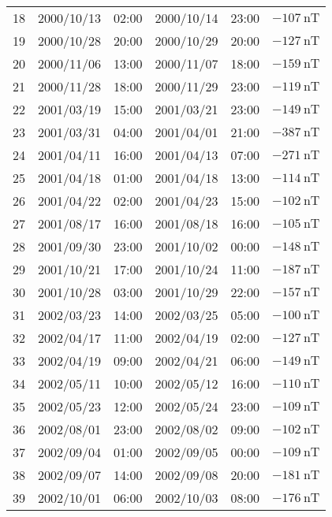 \begin{table}[ht]
\begin{adjustbox}{width=\textwidth,totalheight=0.9\textheight,keepaspectratio}
\begin{tabular}{cccccc}
    18 & 2000/10/13 & 02:00 & 2000/10/14 & 23:00 & $ \SI{-107}{\nano\tesla}$ \\
    19 & 2000/10/28 & 20:00 & 2000/10/29 & 20:00 & $ \SI{-127}{\nano\tesla}$ \\
    20 & 2000/11/06 & 13:00 & 2000/11/07 & 18:00 & $ \SI{-159}{\nano\tesla}$ \\
    21 & 2000/11/28 & 18:00 & 2000/11/29 & 23:00 & $ \SI{-119}{\nano\tesla}$ \\
    22 & 2001/03/19 & 15:00 & 2001/03/21 & 23:00 & $ \SI{-149}{\nano\tesla}$ \\
    23 & 2001/03/31 & 04:00 & 2001/04/01 & 21:00 & $ \SI{-387}{\nano\tesla}$ \\
    24 & 2001/04/11 & 16:00 & 2001/04/13 & 07:00 & $ \SI{-271}{\nano\tesla}$ \\
    25 & 2001/04/18 & 01:00 & 2001/04/18 & 13:00 & $ \SI{-114}{\nano\tesla}$ \\
    26 & 2001/04/22 & 02:00 & 2001/04/23 & 15:00 & $ \SI{-102}{\nano\tesla}$ \\
    27 & 2001/08/17 & 16:00 & 2001/08/18 & 16:00 & $ \SI{-105}{\nano\tesla}$ \\
    28 & 2001/09/30 & 23:00 & 2001/10/02 & 00:00 & $ \SI{-148}{\nano\tesla}$ \\
    29 & 2001/10/21 & 17:00 & 2001/10/24 & 11:00 & $ \SI{-187}{\nano\tesla}$ \\
    30 & 2001/10/28 & 03:00 & 2001/10/29 & 22:00 & $ \SI{-157}{\nano\tesla}$ \\
    31 & 2002/03/23 & 14:00 & 2002/03/25 & 05:00 & $ \SI{-100}{\nano\tesla}$ \\
    32 & 2002/04/17 & 11:00 & 2002/04/19 & 02:00 & $ \SI{-127}{\nano\tesla}$ \\
    33 & 2002/04/19 & 09:00 & 2002/04/21 & 06:00 & $ \SI{-149}{\nano\tesla}$ \\
    34 & 2002/05/11 & 10:00 & 2002/05/12 & 16:00 & $ \SI{-110}{\nano\tesla}$ \\
    35 & 2002/05/23 & 12:00 & 2002/05/24 & 23:00 & $ \SI{-109}{\nano\tesla}$ \\
    36 & 2002/08/01 & 23:00 & 2002/08/02 & 09:00 & $ \SI{-102}{\nano\tesla}$ \\
    37 & 2002/09/04 & 01:00 & 2002/09/05 & 00:00 & $ \SI{-109}{\nano\tesla}$ \\
    38 & 2002/09/07 & 14:00 & 2002/09/08 & 20:00 & $ \SI{-181}{\nano\tesla}$ \\
    39 & 2002/10/01 & 06:00 & 2002/10/03 & 08:00 & $ \SI{-176}{\nano\tesla}$ \\

\end{tabular}
\end{adjustbox}
\end{table}
